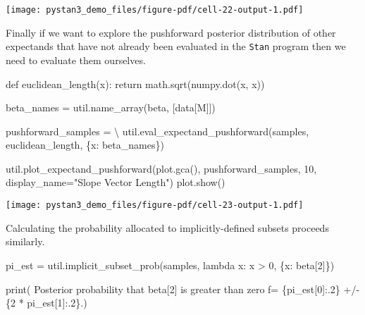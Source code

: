 \documentclass[
  letterpaper,
  DIV=11,
  numbers=noendperiod]{scrartcl}
\newenvironment{Shaded}{\begin{snugshade}}{\end{snugshade}}
\newcommand{\BuiltInTok}[1]{\textcolor[rgb]{0.00,0.23,0.31}{#1}}
\newcommand{\ControlFlowTok}[1]{\textcolor[rgb]{0.00,0.23,0.31}{#1}}
\newcommand{\DecValTok}[1]{\textcolor[rgb]{0.68,0.00,0.00}{#1}}
\newcommand{\KeywordTok}[1]{\textcolor[rgb]{0.00,0.23,0.31}{#1}}
\newcommand{\NormalTok}[1]{\textcolor[rgb]{0.00,0.23,0.31}{#1}}
\newcommand{\OperatorTok}[1]{\textcolor[rgb]{0.37,0.37,0.37}{#1}}
\newcommand{\SpecialCharTok}[1]{\textcolor[rgb]{0.37,0.37,0.37}{#1}}
\newcommand{\SpecialStringTok}[1]{\textcolor[rgb]{0.13,0.47,0.30}{#1}}
\newcommand{\StringTok}[1]{\textcolor[rgb]{0.13,0.47,0.30}{#1}}
\begin{document}
\texttt{[image: pystan3\_demo\_files/figure-pdf/cell-22-output-1.pdf]}

Finally if we want to explore the pushforward posterior distribution of
other expectands that have not already been evaluated in the
\texttt{Stan} program then we need to evaluate them ourselves.

\begin{Shaded}
\begin{Highlighting}[]
\KeywordTok{def}\NormalTok{ euclidean\_length(x):}
  \ControlFlowTok{return}\NormalTok{ math.sqrt(numpy.dot(x, x))}

\NormalTok{beta\_names }\OperatorTok{=}\NormalTok{ util.name\_array(}\StringTok{\textquotesingle{}beta\textquotesingle{}}\NormalTok{, [data[}\StringTok{\textquotesingle{}M\textquotesingle{}}\NormalTok{]])}

\NormalTok{pushforward\_samples }\OperatorTok{=} \OperatorTok{\textbackslash{}}
\NormalTok{  util.eval\_expectand\_pushforward(samples, euclidean\_length,}
\NormalTok{                                  \{}\StringTok{\textquotesingle{}x\textquotesingle{}}\NormalTok{: beta\_names\})}

\NormalTok{util.plot\_expectand\_pushforward(plot.gca(), pushforward\_samples, }\DecValTok{10}\NormalTok{,}
\NormalTok{                                display\_name}\OperatorTok{=}\StringTok{"Slope Vector Length"}\NormalTok{)}
\NormalTok{plot.show()}
\end{Highlighting}
\end{Shaded}

\texttt{[image: pystan3\_demo\_files/figure-pdf/cell-23-output-1.pdf]}

Calculating the probability allocated to implicitly-defined subsets
proceeds similarly.

\begin{Shaded}
\begin{Highlighting}[]
\NormalTok{pi\_est }\OperatorTok{=}\NormalTok{ util.implicit\_subset\_prob(samples,}
                                   \KeywordTok{lambda}\NormalTok{ x: x }\OperatorTok{\textgreater{}} \DecValTok{0}\NormalTok{,}
\NormalTok{                                   \{}\StringTok{\textquotesingle{}x\textquotesingle{}}\NormalTok{: }\StringTok{\textquotesingle{}beta[2]\textquotesingle{}}\NormalTok{\})}

\BuiltInTok{print}\NormalTok{( }\StringTok{\textquotesingle{}Posterior probability that beta[2] is greater than zero \textquotesingle{}}
      \SpecialStringTok{f\textquotesingle{}= }\SpecialCharTok{\{}\NormalTok{pi\_est[}\DecValTok{0}\NormalTok{]}\SpecialCharTok{:.2\}}\SpecialStringTok{ +/{-} }\SpecialCharTok{\{}\DecValTok{2} \OperatorTok{*}\NormalTok{ pi\_est[}\DecValTok{1}\NormalTok{]}\SpecialCharTok{:.2\}}\SpecialStringTok{.\textquotesingle{}}\NormalTok{)}
\end{Highlighting}
\end{Shaded}
\end{document}
